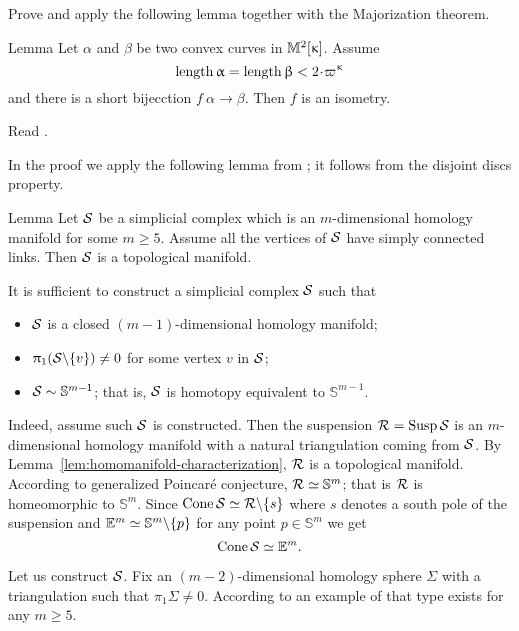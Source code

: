 Prove and apply the following lemma together with the Majorization theorem.
\begin{thm}{Lemma}\label{lem:short+convex}
Let $\alpha$ and $\beta$ be two convex curves in $\mathbb{M}_{{}}^{2}[{\upkappa}]$.
Assume 
\[\length \alpha=\length\beta<2\cdot\varpi\kappa\]
and there is a short bijecction $f\:\alpha\to\beta$.
Then $f$ is an isometry.
\end{thm}

Read \cite{lebedeva-petrunin}.

 In the proof we apply the following lemma from \cite{edwards}; 
it follows from the disjoint discs property.


\begin{thm}{Lemma}\label{lem:homomanifold-characterization}
Let $\mathcal{S}$ be a simplicial complex which 
is an $m$-dimensional homology manifold for some $m\ge 5$.
Assume all the vertices of
$\mathcal{S}$ have simply connected links.
Then $\mathcal{S}$ is a topological manifold.
\end{thm}


It is sufficient to construct a simplicial complex $\mathcal{S}$
such that 
\begin{itemize}
\item $\mathcal{S}$ is a closed $(m-1)$-dimensional homology manifold;
\item $\uppi_1(\mathcal{S}\backslash\{v\})\ne0$ for some vertex $v$ in $\mathcal{S}$;
\item $\mathcal{S}\sim \mathbb{S}^{m-1}$; that is, $\mathcal{S}$ is homotopy equivalent to $\mathbb{S}^{m-1}$.
\end{itemize}

Indeed, assume such $\mathcal{S}$ is constructed.
Then the suspension
$\spc{R}\z=\Susp\spc{S}$
is an $m$-dimensional homology manifold with a natural triangulation coming from $\mathcal{S}$.
By Lemma~\ref{lem:homomanifold-characterization},
$\mathcal{R}$ is a topological manifold.
According to generalized Poincar\'{e} conjecture,
$\mathcal{R}\simeq\mathbb{S}^m$;
that is
$\mathcal{R}$ is homeomorphic to $\mathbb{S}^m$.
Since $\mathop{\rm Cone}\nolimits \mathcal{S}\simeq \mathcal{R}\backslash\{s\}$ where $s$ denotes a south pole of the suspension 
and $\mathbb{E}^m\simeq \mathbb{S}^m\backslash\{p\}$
for any point $p\in \mathbb{S}^m$
we get 
\[\mathop{\rm Cone}\nolimits \mathcal{S}\simeq\mathbb{E}^m.\]

Let us construct $\mathcal{S}$.
Fix an $(m-2)$-dimensional homology sphere $\Sigma$ with a triangulation such that $\pi_1\Sigma\ne0$.
According to \cite{kervaire} %
an example of that type exists for any $m\ge 5$.

